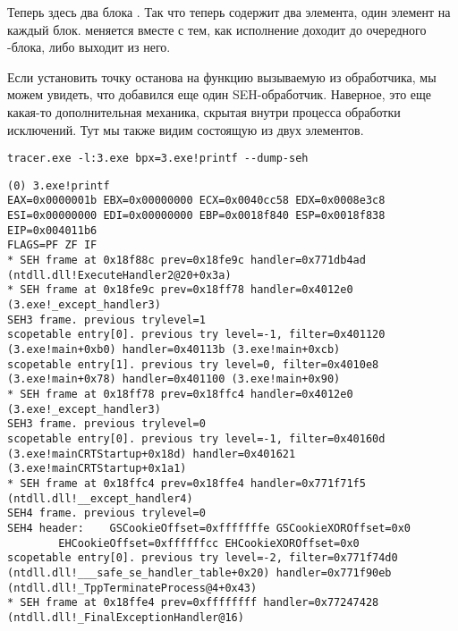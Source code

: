 

Теперь здесь два блока .
Так что  теперь содержит два элемента, один элемент на каждый блок.
 меняется вместе с тем, как исполнение доходит до очередного -блока, либо выходит из него.



Если установить точку останова на функцию \printf{} вызываемую из обработчика,
мы можем увидеть, что добавился еще один SEH-обработчик.
Наверное, это еще какая-то дополнительная механика, скрытая внутри процесса обработки исключений.
Тут мы также видим  состоящую из двух элементов.

\begin{lstlisting}
tracer.exe -l:3.exe bpx=3.exe!printf --dump-seh
\end{lstlisting}

\begin{lstlisting}[caption=tracer.exe output]
(0) 3.exe!printf
EAX=0x0000001b EBX=0x00000000 ECX=0x0040cc58 EDX=0x0008e3c8
ESI=0x00000000 EDI=0x00000000 EBP=0x0018f840 ESP=0x0018f838
EIP=0x004011b6
FLAGS=PF ZF IF
* SEH frame at 0x18f88c prev=0x18fe9c handler=0x771db4ad (ntdll.dll!ExecuteHandler2@20+0x3a)
* SEH frame at 0x18fe9c prev=0x18ff78 handler=0x4012e0 (3.exe!_except_handler3)
SEH3 frame. previous trylevel=1
scopetable entry[0]. previous try level=-1, filter=0x401120 (3.exe!main+0xb0) handler=0x40113b (3.exe!main+0xcb)
scopetable entry[1]. previous try level=0, filter=0x4010e8 (3.exe!main+0x78) handler=0x401100 (3.exe!main+0x90)
* SEH frame at 0x18ff78 prev=0x18ffc4 handler=0x4012e0 (3.exe!_except_handler3)
SEH3 frame. previous trylevel=0
scopetable entry[0]. previous try level=-1, filter=0x40160d (3.exe!mainCRTStartup+0x18d) handler=0x401621 (3.exe!mainCRTStartup+0x1a1)
* SEH frame at 0x18ffc4 prev=0x18ffe4 handler=0x771f71f5 (ntdll.dll!__except_handler4)
SEH4 frame. previous trylevel=0
SEH4 header:	GSCookieOffset=0xfffffffe GSCookieXOROffset=0x0
		EHCookieOffset=0xffffffcc EHCookieXOROffset=0x0
scopetable entry[0]. previous try level=-2, filter=0x771f74d0 (ntdll.dll!___safe_se_handler_table+0x20) handler=0x771f90eb (ntdll.dll!_TppTerminateProcess@4+0x43)
* SEH frame at 0x18ffe4 prev=0xffffffff handler=0x77247428 (ntdll.dll!_FinalExceptionHandler@16)
\end{lstlisting}


